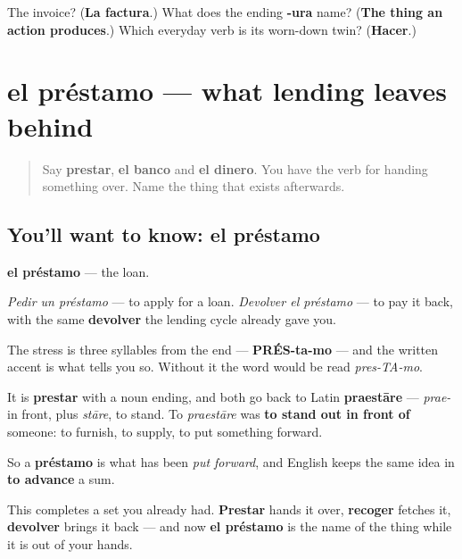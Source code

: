 \begin{tcolorbox}[breakable,colback=teal!4,colframe=teal!35!black,title={Before you move on}]
The invoice? (\textbf{La factura}.) What does the ending \textbf{-ura} name? (\textbf{The thing an action produces}.) Which everyday verb is its worn-down twin? (\textbf{Hacer}.)
\end{tcolorbox}
\section[el préstamo]{el préstamo — what lending leaves behind}

\label{lesson:ES-C441-prestamo}



\begin{quote}
Say \textbf{prestar}, \textbf{el banco} and \textbf{el dinero}. You have the verb for handing something over. Name the thing that exists afterwards.
\end{quote}

\subsection*{You'll want to know: el préstamo}
\textbf{el préstamo} — the loan.

\emph{Pedir un préstamo} — to apply for a loan. \emph{Devolver el préstamo} — to pay it back, with the same \textbf{devolver} the lending cycle already gave you.

The stress is three syllables from the end — \textbf{PRÉS-ta-mo} — and the written accent is what tells you so. Without it the word would be read \emph{pres-TA-mo}.

\begin{cousinweb}
It is \textbf{prestar} with a noun ending, and both go back to Latin \textbf{praestāre} — \emph{prae-} in front, plus \emph{stāre}, to stand. To \emph{praestāre} was \textbf{to stand out in front of} someone: to furnish, to supply, to put something forward.

So a \textbf{préstamo} is what has been \emph{put forward}, and English keeps the same idea in \textbf{to advance} a sum.

This completes a set you already had. \textbf{Prestar} hands it over, \textbf{recoger} fetches it, \textbf{devolver} brings it back — and now \textbf{el préstamo} is the name of the thing while it is out of your hands.
\end{cousinweb}

